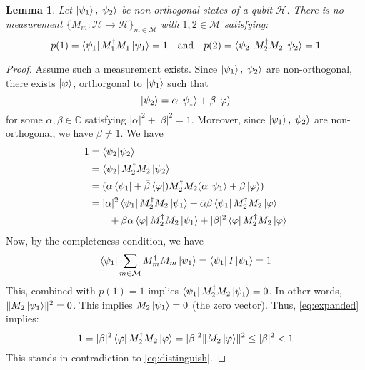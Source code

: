 \documentclass[12pt]{article}
\theoremstyle{plain}
\newtheorem{lemma}[thm]{Lemma}
\theoremstyle{definition}
\newcommand{\bb}[1]{\mathbb{#1}}
\newcommand{\call}[1]{\mathcal{#1}}
\newcommand{\lto}{\longrightarrow}
\begin{document}
\begin{lemma}\label{lem:nonorthogonal_indistinguishability}
	Let $\ket{\psi_1}, \ket{\psi_2}$ be non-orthogonal states of a qubit $\call{H}$. There is no measurement $\{ M_m: \call{H} \lto \call{H} \}_{m \in \call{M}}$ with $1,2 \in \call{M}$ satisfying:
	\begin{equation}\label{eq:distinguish}
		p(1) = \bra{\psi_1} M_{1}^\dagger M_1\ket{\psi_1} = 1\quad \text{and}\quad p(2) = \bra{\psi_2} M_2^\dagger M_2\ket{\psi_2} = 1
		\end{equation}
	\end{lemma}
\begin{proof}
	Assume such a measurement exists. Since $\ket{\psi_1}, \ket{\psi_2}$ are non-orthogonal, there exists $\ket{\varphi}$, orthorgonal to $\ket{\psi_1}$ such that
	\begin{equation}
		\ket{\psi_2} = \alpha \ket{\psi_1} + \beta \ket{\varphi}
		\end{equation}
	for some $\alpha, \beta \in \bb{C}$ satisfying $|\alpha|^2 + |\beta|^2 = 1$. Moreover, since $\ket{\psi_1}, \ket{\psi_2}$ are non-orthogonal, we have $\beta \neq 1$. We have
	\begin{align}
		1 &= \bra{\psi_2}\ket{\psi_2}\\
		&= \bra{\psi_2} M_2^\dagger M_2 \ket{\psi_2}\\
		&= (\bar{\alpha}\bra{\psi_1} + \bar{\beta}\bra{\varphi})M_2^\dagger M_2(\alpha \ket{\psi_1} + \beta \ket{\varphi})\\
		&\label{eq:expanded}= |\alpha|^2\bra{\psi_1}M_2^\dagger M_2\ket{\psi_1} + \bar{\alpha}\beta \bra{\psi_1}M_2^\dagger M_2 \ket{\varphi}\\
		&\qquad+ \bar{\beta}\alpha\bra{\varphi}M_2^\dagger M_2\ket{\psi_1} + |\beta|^2 \bra{\varphi}M_2^\dagger M_2\ket{\varphi}
		\end{align}
	Now, by the completeness condition, we have
	\begin{equation}
		\bra{\psi_1} \sum_{m \in \call{M}}M_m^\dagger M_m\ket{\psi_1} = \bra{\psi_1} I \ket{\psi_1} = 1
		\end{equation}
	This, combined with $p(1) = 1$ implies $\bra{\psi_1} M_2^\dagger M_2 \ket{\psi_1} = 0$. In other words, $\lVert M_2 \ket{\psi_1} \rVert^2 = 0$. This implies $M_2\ket{\psi_1} = 0$ (the zero vector). Thus, \eqref{eq:expanded} implies:
	\begin{equation}
		1 = |\beta|^2 \bra{\varphi} M_2^\dagger M_2 \ket{\varphi} = |\beta|^2 \lVert M_2 \ket{\varphi}\rVert^2 \leq |\beta|^2 < 1
		\end{equation}
	This stands in contradiction to \eqref{eq:distinguish}.
	\end{proof}
\end{document}
